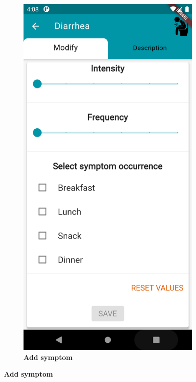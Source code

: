 \documentclass [12pt]{article}
\begin{document}
\begin{description}[leftmargin=1cm,rightmargin=1cm]
\begin{figure}[h!]
\begin{subfigure}[tr]{0.3\linewidth}
\includegraphics[width=\linewidth]{addSymptom2.PNG}
\caption{\textbf{Add symptom}}
\end{subfigure}
\hspace*{\fill}

\end{figure}
\end{description}
\end{document}
